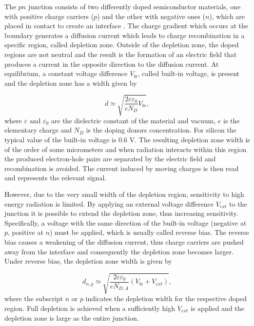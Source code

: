 The $pn$ junction  consists of two differently doped semiconductor materials, one with positive charge carriers ($p$) and the other with negative ones ($n$), which are placed in contact to create an interface \cite{kolanoski2020}. The charge gradient which occurs at the boundary generates a diffusion current which leads to charge recombination in a specific region, called depletion zone. Outside of the depletion zone, the doped regions are not neutral and the result is the formation of an electric field that produces a current in the opposite direction to the diffusion current. At equilibrium, a constant voltage difference $V_{bi}$, called built-in voltage, is present and the depletion zone has a width given by

\begin{equation}
d \simeq \sqrt{\frac{2\varepsilon \varepsilon_0}{eN_D} V_{bi}},
\end{equation}
where $\varepsilon$ and $\varepsilon_0$ are the dielectric constant of the material and vacuum, $e$ is the elementary charge and $N_D$ is the doping donors concentration. For silicon the typical value of the built-in voltage is 0.6 V. The resulting depletion zone width is of the order of some micrometers and when radiation interacts within this region the produced electron-hole pairs are separated by the electric field and recombination is avoided. The current induced by moving charges is then read and represents the relevant signal.

However, due to the very small width of the depletion region, sensitivity to high energy radiation is limited. By applying an external voltage difference $V_{ext}$ to the junction it is possible to extend the depletion zone, thus increasing sensitivity. Specifically, a voltage with the same direction of the built-in voltage (negative at $p$, positive at $n$) must be applied, which is usually called reverse bias. The reverse bias causes a weakening of the diffusion current, thus charge carriers are pushed away from the interface and consequently the depletion zone becomes larger. Under reverse bias, the depletion zone width is given by

\begin{equation}
d_{n,p} \simeq \sqrt{\frac{2\varepsilon \varepsilon_0}{eN_{D, A}} (V_{bi} + V_{ext})},
\label{eq:dep_zone}
\end{equation}
where the subscript $n$ or $p$ indicates the depletion width for the respective doped region. Full depletion is achieved when a sufficiently high $V_{ext}$ is applied and the depletion zone is large as the entire junction.

